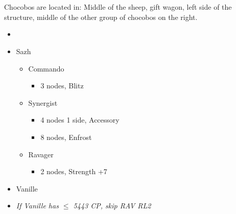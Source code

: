 \chapter[Chapter 8]{}

\begin{multicols}{2}
  Chocobos are located in: Middle of the sheep, gift wagon, left side of the structure, middle of the other group of chocobos on the right.
  \begin{menu}
    \begin{itemize}
      \paradigm
      \begin{itemize}
        \item {}%
              {\paradigmline[1]{\textit{\com}}{\textit{\rav}}{}}%
              {\paradigmline{(\com)}{(\med)}{}}%
              {\paradigmline{\syn}{\sab}{}}%
              {\paradigmline{\rav}{\rav}{}}%
              {\paradigmline{\rav}{\sab}{}}%
              {\paradigmline{\com}{\sab}{}}
      \end{itemize}
      \crystarium
      \begin{itemize}
        \item Sazh
              \begin{itemize}
                \item Commando
                      \begin{itemize}
                        \item 3 nodes, Blitz
                      \end{itemize}
                \item Synergist
                      \begin{itemize}
                        \item 4 nodes 1 side, Accessory
                        \item 8 nodes, Enfrost
                      \end{itemize}
                \item Ravager
                      \begin{itemize}
                        \item 2 nodes, Strength +7
                      \end{itemize}
              \end{itemize}
        \item Vanille
        \item \textit{If Vanille has $\le$ 5443 CP, skip RAV RL2}
              \begin{itemize}

\end{itemize}
\end{itemize}
\end{itemize}
\end{menu}
\end{multicols}
